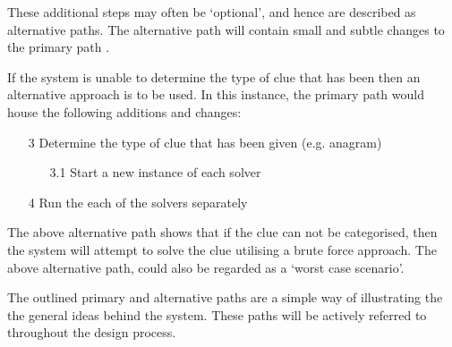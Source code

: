 These additional steps may often be `optional', and hence are described as 
alternative paths. The alternative path will contain small and subtle changes 
to the primary path \citep{lunn03}.

If the system is unable to determine the type of clue that has been then an 
alternative approach is to be used. In this instance, the primary path would 
house the following additions and changes:

\begin{enumerate}
  \item[3] Determine the type of clue that has been given (e.g. anagram)
  \begin{enumerate}
    \item[3.1] Start a new instance of each solver
  \end{enumerate}
  \item[4] Run the each of the solvers separately
\end{enumerate}

The above alternative path shows that if the clue can not be categorised, then 
the system will attempt to solve the clue utilising a brute force approach. The 
above alternative path, could also be regarded as a `worst case scenario'.

The outlined primary and alternative paths are a simple way of illustrating the 
the general ideas behind the system. These paths will be actively referred to 
throughout the design process.
